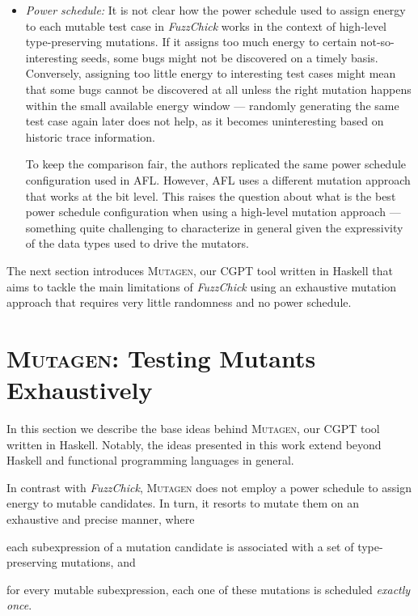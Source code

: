 \documentclass[sigconf, anonymous]{acmart}
\newcommand{\fuzzchick}{\textit{FuzzChick}\xspace}
\newcommand{\mutagen}{\textsc{Mutagen}\xspace}
\begin{document}
\begin{itemize}
\item \emph{Power schedule:}
%
It is not clear how the power schedule used to assign energy to each mutable
test case in \fuzzchick works in the context of high-level type-preserving
mutations.
%
If it assigns too much energy to certain not-so-interesting seeds, some bugs
might not be discovered on a timely basis.
%
Conversely, assigning too little energy to interesting test cases might mean
that some bugs cannot be discovered at all unless the right mutation happens
within the small available energy window --- randomly generating the same test
case again later does not help, as it becomes uninteresting based on historic
trace information.

To keep the comparison fair, the authors replicated the same power schedule
configuration used in AFL.
%
However, AFL uses a different mutation approach that works at the bit level.
%
This raises the question about what is the best power schedule configuration
when using a high-level mutation approach --- something quite challenging to
characterize in general given the expressivity of the data types used to drive
the mutators.\\

\end{itemize}


The next section introduces \mutagen, our CGPT tool written in Haskell that aims
to tackle the main limitations of \fuzzchick using an exhaustive mutation
approach that requires very little randomness and no power schedule.


\section{\mutagen: Testing Mutants Exhaustively}
\label{sec:mutagen}

In this section we describe the base ideas behind \mutagen, our CGPT tool
written in Haskell.
%
Notably, the ideas presented in this work extend beyond Haskell and functional
programming languages in general.
%

In contrast with \fuzzchick, \mutagen does not employ a power schedule to assign
energy to mutable candidates.
%
In turn, it resorts to mutate them on an exhaustive and precise manner, where
%
\begin{inparaenum}
  \item each subexpression of a mutation candidate is associated with a set of
    type-preserving mutations, and
  \item for every mutable subexpression, each one of these mutations is
    scheduled \emph{exactly once}.
\end{inparaenum}
%
\end{document}
